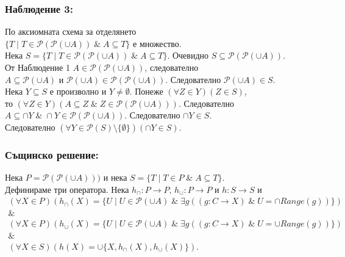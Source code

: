 \documentclass[12pt]{article}
\begin{document}
\subsubsection*{Наблюдение 3:}
По аксиомната схема за отделянето \\
\(\{T \; | \; T \in \mathcal{P}(\mathcal{P}(\cup A)) \; \& \; A \subseteq T \}\) е множество. \\
Нека  \(S = \{T \; | \; T \in \mathcal{P}(\mathcal{P}(\cup A)) \; \& \; A \subseteq T \}\). Очевидно \(S \subseteq \mathcal{P}(\mathcal{P}(\cup A))\). \\
От Наблюдение 1 
\(A \in \mathcal{P}(\mathcal{P}(\cup A))\), следователно \\
\(A \subseteq \mathcal{P}(\cup A)\) и \(\mathcal{P}(\cup A) \in \mathcal{P}(\mathcal{P}(\cup A))\).
Следователно \(\mathcal{P}(\cup A) \in S\). \\
Нека \(Y \subseteq S\) е произволно и \(Y \neq \emptyset\).
Понеже \((\forall Z \in Y)(Z \in S)\), \\
то \((\forall Z \in Y)(A \subseteq Z \; \& \; Z \in \mathcal{P}(\mathcal{P}(\cup A)))\).
Следователно \\
\(A \subseteq \cap Y \; \& \; \cap Y \in \mathcal{P}(\mathcal{P}(\cup A))\).
Следователно \(\cap Y \in S\). \\
Следователно \((\forall Y \in \mathcal{P}(S) \setminus \{\emptyset\})(\cap Y \in S)\).

\subsubsection*{Същинско решение:}
Нека \(P = \mathcal{P}(\mathcal{P}(\cup A)))\)
и нека \(S = \{T \; | \; T \in P \; \& \; A \subseteq T \}\). \\
Дефинираме три оператора.
Нека \(h_\cap : P \to P\), \(h_\cup : P \to P\) и \(h : S \to S\) и
\begin{align*}
    (\forall X \in P)(h_\cap(X) = \{U \; | \; U \in \mathcal{P}(\cup A) \; \& \; \exists g ((g : C \to X) \; \& \; U = \cap Range(g))\}) \\
    \& \\
    (\forall X \in P)(h_\cup(X) = \{U \; | \; U \in \mathcal{P}(\cup A) \; \& \; \exists g ((g : C \to X) \; \& \; U = \cup Range(g))\}) \\
    \& \\
    (\forall X \in S)(h(X) = \cup \{X,  h_\cap(X), h_\cup(X)\}).
\end{align*}
\end{document}
